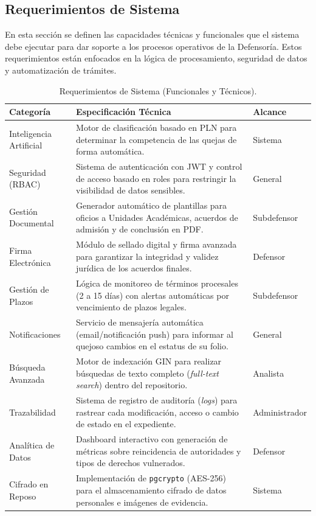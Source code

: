 \documentclass[12pt, oneside, letterpaper]{book}
\begin{document}
\subsection{Requerimientos de Sistema}

En esta sección se definen las capacidades técnicas y funcionales que el sistema
debe ejecutar para dar soporte a los procesos operativos de la Defensoría. Estos
requerimientos están enfocados en la lógica de procesamiento, seguridad de datos
y automatización de trámites.

\begin{table}[H]
\centering
\caption{Requerimientos de Sistema (Funcionales y Técnicos).}
\begin{tabularx}{\textwidth}{@{} l L l @{}}
\toprule
{}
\textbf{\color{white} Categoría} & \textbf{\color{white} Especificación Técnica} &
\textbf{\color{white} Alcance} \\ \midrule
{}
Inteligencia Artificial & Motor de clasificación basado en PLN para determinar la competencia de las quejas de forma automática. & Sistema \\
Seguridad (RBAC) & Sistema de autenticación con JWT y control de acceso basado en roles para restringir la visibilidad de datos sensibles. & General \\
Gestión Documental & Generador automático de plantillas para oficios a Unidades Académicas, acuerdos de admisión y de conclusión en PDF. & Subdefensor \\
Firma Electrónica & Módulo de sellado digital y firma avanzada para garantizar la integridad y validez jurídica de los acuerdos finales. & Defensor \\
Gestión de Plazos & Lógica de monitoreo de términos procesales (2 a 15 días) con alertas automáticas por vencimiento de plazos legales. & Subdefensor \\
Notificaciones & Servicio de mensajería automática (email/notificación push) para informar al quejoso cambios en el estatus de su folio. & General \\
Búsqueda Avanzada & Motor de indexación GIN para realizar búsquedas de texto completo (\textit{full-text search}) dentro del repositorio. & Analista \\
Trazabilidad & Sistema de registro de auditoría (\textit{logs}) para rastrear cada modificación, acceso o cambio de estado en el expediente. & Administrador \\
Analítica de Datos & Dashboard interactivo con generación de métricas sobre reincidencia de autoridades y tipos de derechos vulnerados. & Defensor \\
Cifrado en Reposo & Implementación de \texttt{pgcrypto} (AES-256) para el almacenamiento cifrado de datos personales e imágenes de evidencia. & Sistema \\ \bottomrule
\end{tabularx}
\end{table}
\end{document}
